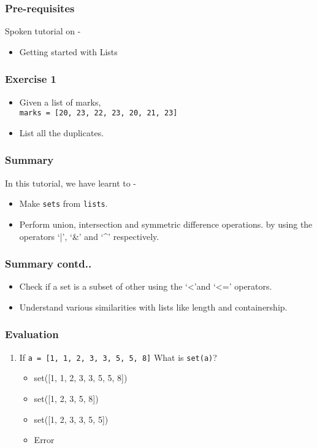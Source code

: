 \documentclass[17pt,compress]{beamer}
\newcounter{saveenumi}
\newcommand{\seti}{\setcounter{saveenumi}{\value{enumi}}}
\begin{document}
\begin{frame}
\frametitle{Pre-requisites}
\label{sec-3}

Spoken tutorial on -
\begin{itemize}
\item Getting started with Lists
\end{itemize}
\end{frame}
\begin{frame}
\frametitle{Exercise 1}
\label{sec-4}


\begin{itemize}
\item Given a list of marks,\\
\texttt{marks = [20, 23, 22, 23, 20, 21, 23]}\pause
\item List all the duplicates.
 \end{itemize}
\end{frame}
\begin{frame}
\frametitle{Summary}
\label{sec-5.1}

 In this tutorial, we have learnt to -

\begin{itemize}
\item Make \texttt{sets} from \texttt{lists}.
\item Perform union, intersection and symmetric difference operations.
   by using the operators `|', `\&' and `\textasciicircum'  respectively.
\end{itemize}
\end{frame}
\begin{frame}
\frametitle{Summary contd..}
\label{sec-5.2}

\begin{itemize}
\item Check if a set is a subset of other using the `<'and `<=' operators.
\item Understand various similarities with lists like length and containership.
\end{itemize}
\end{frame}
\begin{frame}
\frametitle{Evaluation}
\label{sec-6.1}

\begin{enumerate}
\item If \texttt{a = [1, 1, 2, 3, 3, 5, 5, 8]} What is \texttt{set(a)}?\pause
\vspace{3pt}
\begin{itemize}
\item set([1, 1, 2, 3, 3, 5, 5, 8])
\item set([1, 2, 3, 5, 8])
\item set([1, 2, 3, 3, 5, 5])
\item Error
\end{itemize}
\seti
\end{enumerate}
\end{frame}
\end{document}
